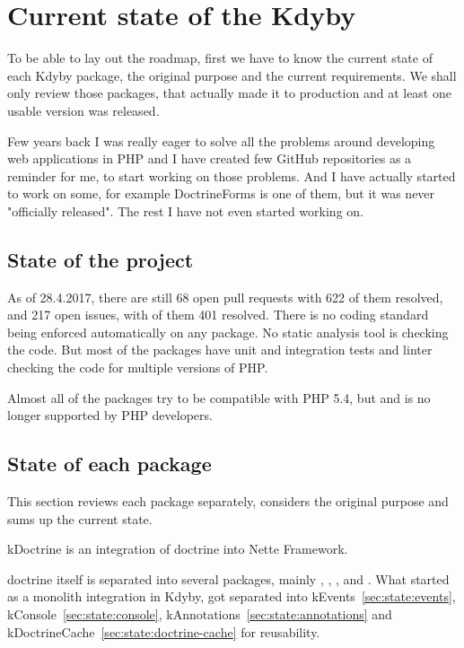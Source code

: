 \chapter{Current state of the Kdyby}

To be able to lay out the roadmap, first we have to know the current state of each Kdyby package, the original purpose and the current requirements. We shall only review those packages, that actually made it to production and at least one usable version was released.

Few years back I was really eager to solve all the problems around developing web applications in PHP and I have created few GitHub repositories as a reminder for me, to start working on those problems. And I have actually started to work on some, for example DoctrineForms is one of them, but it was never "officially released". The rest I have not even started working on.

\section{State of the project}

As of 28.4.2017, there are still 68 open pull requests with 622 of them resolved, and 217 open issues, with of them 401 resolved. There is no coding standard being enforced automatically on any package. No static analysis tool is checking the code. But most of the packages have unit and integration tests and linter checking the code for multiple versions of PHP.

Almost all of the packages try to be compatible with PHP 5.4, but  and is no longer supported by PHP developers.

\section{State of each package}

This section reviews each package separately, considers the original purpose and sums up the current state.

 \label{sec:state:doctrine}

\gls{kDoctrine} is an integration of \gls{doctrine} into Nette Framework.

\gls{doctrine} itself is separated into several packages, mainly , , ,  and . What started as a monolith integration in Kdyby, got separated into \gls{kEvents}~\ref{sec:state:events}, \gls{kConsole}~\ref{sec:state:console}, \gls{kAnnotations}~\ref{sec:state:annotations} and \gls{kDoctrineCache}~\ref{sec:state:doctrine-cache} for reusability.

